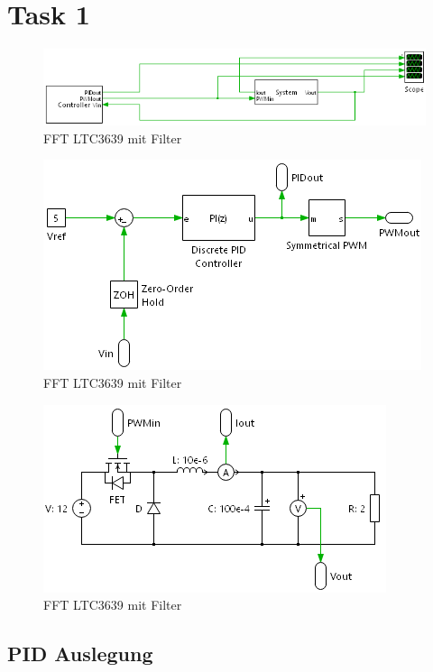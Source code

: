 \section{Task 1} \label{sec:Task1}


\begin{figure}[H]
    \centering
    \includegraphics[width=0.8\linewidth]{Figure/Soft.png}
    \caption{FFT LTC3639 mit Filter}
    \label{fig:Soft}
\end{figure}

\begin{figure}[H]
    \centering
    \includegraphics[width=0.8\linewidth]{Figure/ControllerSoft.png}
    \caption{FFT LTC3639 mit Filter}
    \label{fig:ControllerSoft}
\end{figure}

\begin{figure}[H]
    \centering
    \includegraphics[width=0.8\linewidth]{Figure/SystemSoft.png}
    \caption{FFT LTC3639 mit Filter}
    \label{fig:SystemSoft}
\end{figure}


\subsection{PID Auslegung}

